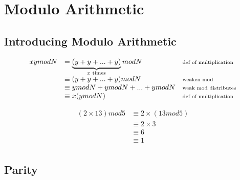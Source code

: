 
\chapter{Modulo Arithmetic}


\section{Introducing Modulo Arithmetic}














\[ 
\begin{array}{ll >{\scriptstyle}l}
xy mod N &= \underbrace{(y + y + ... + y)}_{x \text{ times}} mod N & \text{def of multiplication}  \\
         &\equiv (y + y + ... + y) mod N & \text{weaken mod}  \\
         &\equiv y mod N + y mod N + ... + y mod N & \text{weak mod distributes}\\
         &\equiv x(y mod N) & \text{def of multiplication}\\
\end{array}
\]

\frmrule

\begin{example}
\[ 
\begin{array}{ll}
(2 \times 13) mod 5 &\equiv 2 \times (13 mod 5)  \\
                    &\equiv 2 \times 3  \\
                    &\equiv 6  \\
                    &\equiv 1  \\
\end{array}
\]
\end{example}


\frmrule





\frmrule


\section{Parity}

